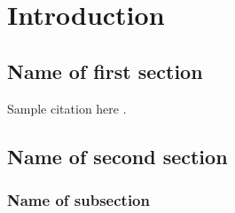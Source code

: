\chapter{Introduction}\label{chap: intro}
\setcounter{page}{1}


\vspace*{-2mm}
\section{Name of first section}\label{sec: chap1 motivation}
Sample citation here \cite{Rijnen1,Rijnen2}.
\lipsum[9-13]


\section{Name of second section}\label{sec: chap1 background}

\lipsum[14-18]

\subsection{Name of subsection}\label{subsec: chap1 background2}

